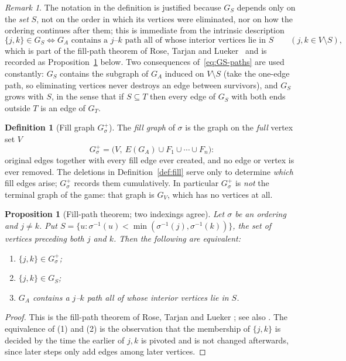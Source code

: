 \documentclass[11pt]{article}
\theoremstyle{plain}
\newtheorem{proposition}[theorem]{Proposition}
\theoremstyle{definition}
\newtheorem{definition}[theorem]{Definition}
\theoremstyle{remark}
\newtheorem{remark}[theorem]{Remark}
\begin{document}
\begin{humanaiblock}
\begin{remark}
    The notation in the definition is justified because $G_S$ depends only on the \emph{set} $S$, not on the order in which
its vertices were eliminated, nor on how the ordering continues after them; this is immediate from the
intrinsic description
\begin{equation}\label{eq:GS-paths}
  \{j,k\}\in G_S \iff \text{$G_A$ contains a $j$--$k$ path all of whose interior vertices lie in $S$}
  \qquad (j,k\in V\setminus S),
\end{equation}
which is part of the fill-path theorem of Rose, Tarjan and Lueker~\cite{Rose} and is recorded as
Proposition~\ref{prop:fillpath} below. Two consequences of~\eqref{eq:GS-paths} are used constantly:
$G_S$ contains the subgraph of $G_A$ induced on $V\setminus S$ (take the one-edge path, so eliminating
vertices never destroys an edge between survivors), and $G_S$ grows with $S$, in the sense that if
$S\subseteq T$ then every edge of $G_S$ with both ends outside $T$ is an edge of $G_T$.
\end{remark}

\begin{definition}[Fill graph $G^+_\sigma$]\label{def:fillgraph}
The \emph{fill graph} of $\sigma$ is the graph on the \emph{full} vertex set $V$
\[
G^+_\sigma=\bigl(V,\ E(G_A)\cup F_1\cup\cdots\cup F_n\bigr):
\]
original edges together with every fill edge ever created, and no edge or vertex is ever removed.
The deletions in Definition~\ref{def:fill} serve only to determine \emph{which} fill edges arise;
$G^+_\sigma$ records them cumulatively. In particular $G^+_\sigma$ is \emph{not} the terminal graph of
the game: that graph is $G_V$, which has no vertices at all.
\end{definition}

\begin{proposition}[Fill-path theorem; two indexings agree]\label{prop:fillpath}
Let $\sigma$ be an ordering and $j\neq k$. Put
$S=\{u:\sigma^{-1}(u)<\min(\sigma^{-1}(j),\sigma^{-1}(k))\}$, the set of vertices preceding both $j$
and $k$. Then the following are equivalent:
\begin{enumerate}
\item $\{j,k\}\in G^+_\sigma$;
\item $\{j,k\}\in G_S$;
\item $G_A$ contains a $j$--$k$ path all of whose interior vertices lie in $S$.
\end{enumerate}
\end{proposition}
\begin{proof}
This is the fill-path theorem of Rose, Tarjan and Lueker \cite{Rose}; see also \cite{Fulkerson}. The
equivalence of (1) and (2) is the observation that the membership of $\{j,k\}$ is decided by the time
the earlier of $j,k$ is pivoted and is not changed afterwards, since later steps only add edges among
later vertices.
\end{proof}


\end{humanaiblock}
\end{document}
